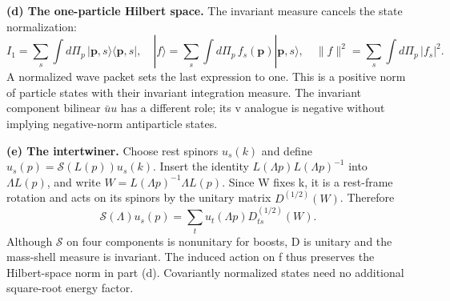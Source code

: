 \documentclass[11pt]{article}
\newcommand{\partsol}[2]{\par\Needspace{4\baselineskip}\medskip\noindent\textbf{(#1) #2.}\quad}
\begin{document}
\partsol{d}{The one-particle Hilbert space}
The invariant measure cancels the state normalization:
\[
 I_1=\sum_s\int d\Pi_p\,|\bm p,s\rangle\langle\bm p,s|,\quad
 |f\rangle=\sum_s\int d\Pi_p\,f_s(\bm p)|\bm p,s\rangle,\quad
 \|f\|^2=\sum_s\int d\Pi_p\,|f_s|^2.
\]
A normalized wave packet sets the last expression to one. This is a
positive norm of particle states with their invariant integration measure.
The invariant component bilinear \(\bar u u\) has a different role; its
v analogue is negative without implying negative-norm antiparticle states.

\partsol{e}{The intertwiner}
Choose rest spinors \(u_s(k)\) and define
\(u_s(p)=\mathcal S(L(p))u_s(k)\). Insert the identity
\(L(\Lambda p)L(\Lambda p)^{-1}\) into \(\Lambda L(p)\), and write
\(W=L(\Lambda p)^{-1}\Lambda L(p)\). Since W fixes k, it is a rest-frame
rotation and acts on its spinors by the unitary matrix \(D^{(1/2)}(W)\).
Therefore
\[
 \mathcal S(\Lambda)u_s(p)
 =\sum_tu_t(\Lambda p)D^{(1/2)}_{ts}(W).
\]
Although \(\mathcal S\) on four components is nonunitary for boosts,
D is unitary and the mass-shell measure is invariant. The induced action
on f thus preserves the Hilbert-space norm in part (d). Covariantly
normalized states need no additional square-root energy factor.
\end{document}
